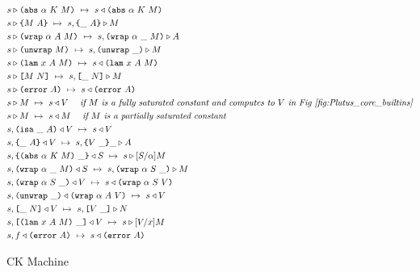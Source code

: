 \documentclass[../main.tex]{subfiles}
\begin{document}
\begin{figure*}[t]
    
    \begin{align*}
        &s \triangleright \texttt{(} \texttt{abs} ~ \alpha ~ K ~ M \texttt{)} ~\mapsto~ s \triangleleft \texttt{(} \texttt{abs} ~ \alpha ~ K ~ M \texttt{)}\\
        &s \triangleright \texttt{\{}M ~ A\texttt{\}} ~\mapsto~ s, \texttt{\{}\_ ~ A\texttt{\}} \triangleright M\\
        &s \triangleright \texttt{(} \texttt{wrap} ~ \alpha ~ A ~ M \texttt{)} ~\mapsto~ s, \texttt{(} \texttt{wrap} ~ \alpha ~ \_ ~ M \texttt{)} \triangleright A\\
        &s \triangleright \texttt{(} \texttt{unwrap} ~ M \texttt{)} ~\mapsto~ s, \texttt{(} \texttt{unwrap} ~ \_ \texttt{)}{} \triangleright M\\
        &s \triangleright \texttt{(} \texttt{lam} ~ x ~ A ~ M \texttt{)} ~\mapsto~ s \triangleleft \texttt{(} \texttt{lam} ~ x ~ A ~ M \texttt{)}\\
        &s \triangleright \texttt{[} M ~ N \texttt{]} ~\mapsto~ s, \texttt{[} \_ ~ N \texttt{]} \triangleright M\\
        &s \triangleright \texttt{(} \texttt{error} ~ A \texttt{)} ~\mapsto~ s \triangleleft \texttt{(} \texttt{error} ~ A \texttt{)}\\
        &s \triangleright M ~\mapsto~ s \triangleleft V ~~~~ \textit{if $M$ is a fully saturated constant and computes to $V$ in Fig \ref{fig:Plutus_core_builtins}}\\
        &s \triangleright M ~\mapsto~ s \triangleleft M ~~~~ \textit{if $M$ is a partially saturated constant}\\
        &s, \texttt{(} \texttt{isa} ~ \_ ~ A \texttt{)} \triangleleft V ~\mapsto~ s \triangleleft V\\
        &s, \texttt{\{}\_ ~ A\texttt{\}} \triangleleft V ~\mapsto~ s, \texttt{\{}V ~ \_\texttt{\}}{\_} \triangleright A\\
        &s, \texttt{\{}\texttt{(} \texttt{abs} ~ \alpha ~ K ~ M \texttt{)} ~ \_\texttt{\}} \triangleleft S ~\mapsto~ s \triangleright [S/\alpha]M\\
        &s, \texttt{(} \texttt{wrap} ~ \alpha ~ \_ ~ M \texttt{)} \triangleleft S ~\mapsto~ s, \texttt{(} \texttt{wrap} ~ \alpha ~ S ~ \_ \texttt{)} \triangleright M\\
        &s, \texttt{(} \texttt{wrap} ~ \alpha ~ S ~ \_ \texttt{)} \triangleleft V ~\mapsto~ s \triangleleft \texttt{(} \texttt{wrap} ~ \alpha ~ S ~ V \texttt{)}\\
        &s, \texttt{(} \texttt{unwrap} ~ \_ \texttt{)}{} \triangleleft \texttt{(} \texttt{wrap} ~ \alpha ~ A ~ V \texttt{)} ~\mapsto~ s \triangleleft V\\
        &s, \texttt{[} \_ ~ N \texttt{]} \triangleleft V ~\mapsto~ s, \texttt{[} V ~ \_ \texttt{]} \triangleright N\\
        &s, \texttt{[} \texttt{(} \texttt{lam} ~ x ~ A ~ M \texttt{)} ~ \_ \texttt{]} \triangleleft V ~\mapsto~ s \triangleright [V/x]M\\
        &s, f \triangleleft \texttt{(} \texttt{error} ~ A \texttt{)} ~\mapsto~ s \triangleleft \texttt{(} \texttt{error} ~ A \texttt{)}\\
    \end{align*}
    
    \caption{CK Machine}
    \label{fig:Plutus_core_ck_machine}
\end{figure*}
\end{document}
